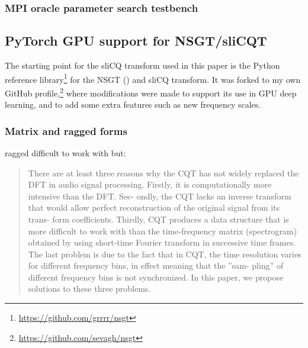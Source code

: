 \documentclass[report.tex]{subfiles}
\begin{document}


\subsubsection{MPI oracle parameter search testbench}


\subsection{PyTorch GPU support for NSGT/sliCQT}
\label{sec:torchslicq}

The starting point for the sliCQ transform used in this paper is the Python reference library\footnote{\url{https://github.com/grrrr/nsgt}} for the NSGT (\cite{slicq}) and sliCQ transform. It was forked to my own GitHub profile,\footnote{\url{https://github.com/sevagh/nsgt}} where modifications were made to support its use in GPU deep learning, and to add some extra features such as new frequency scales.

\subsubsection{Matrix and ragged forms}


ragged difficult to work with but:

\textcite{klapuricqt}
\begin{quote}
	There are at least three reasons why the CQT has not
	widely replaced the DFT in audio signal processing. Firstly,
	it is computationally more intensive than the DFT. Sec-
	ondly, the CQT lacks an inverse transform that would allow
	perfect reconstruction of the original signal from its trans-
	form coefficients. Thirdly, CQT produces a data structure
	that is more difficult to work with than the time-frequency
	matrix (spectrogram) obtained by using short-time Fourier
	transform in successive time frames. The last problem is
	due to the fact that in CQT, the time resolution varies for
	different frequency bins, in effect meaning that the ”sam-
	pling” of different frequency bins is not synchronized. In
	this paper, we propose solutions to these three problems.
\end{quote}
\end{document}
